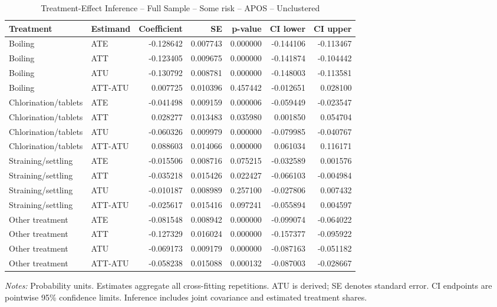 \begin{table}[htbp]
\centering
\caption{Treatment-Effect Inference -- Full Sample -- Some risk -- APOS -- Unclustered}
\label{tab:inference-SomeRiskHome-APOS-iid}
\scriptsize
\begin{adjustbox}{max width=\linewidth}
\begin{tabular}{llrrrrr}
\toprule
Treatment & Estimand & Coefficient & SE & p-value & CI lower & CI upper \\
\midrule
Boiling & ATE & -0.128642 & 0.007743 & 0.000000 & -0.144106 & -0.113467 \\
Boiling & ATT & -0.123405 & 0.009675 & 0.000000 & -0.141874 & -0.104442 \\
Boiling & ATU & -0.130792 & 0.008781 & 0.000000 & -0.148003 & -0.113581 \\
Boiling & ATT-ATU & 0.007725 & 0.010396 & 0.457442 & -0.012651 & 0.028100 \\
Chlorination/tablets & ATE & -0.041498 & 0.009159 & 0.000006 & -0.059449 & -0.023547 \\
Chlorination/tablets & ATT & 0.028277 & 0.013483 & 0.035980 & 0.001850 & 0.054704 \\
Chlorination/tablets & ATU & -0.060326 & 0.009979 & 0.000000 & -0.079985 & -0.040767 \\
Chlorination/tablets & ATT-ATU & 0.088603 & 0.014066 & 0.000000 & 0.061034 & 0.116171 \\
Straining/settling & ATE & -0.015506 & 0.008716 & 0.075215 & -0.032589 & 0.001576 \\
Straining/settling & ATT & -0.035218 & 0.015426 & 0.022427 & -0.066103 & -0.004984 \\
Straining/settling & ATU & -0.010187 & 0.008989 & 0.257100 & -0.027806 & 0.007432 \\
Straining/settling & ATT-ATU & -0.025617 & 0.015416 & 0.097241 & -0.055894 & 0.004597 \\
Other treatment & ATE & -0.081548 & 0.008942 & 0.000000 & -0.099074 & -0.064022 \\
Other treatment & ATT & -0.127329 & 0.016024 & 0.000000 & -0.157377 & -0.095922 \\
Other treatment & ATU & -0.069173 & 0.009179 & 0.000000 & -0.087163 & -0.051182 \\
Other treatment & ATT-ATU & -0.058238 & 0.015088 & 0.000132 & -0.087003 & -0.028667 \\
\bottomrule
\end{tabular}

\end{adjustbox}
\par\smallskip
\begin{minipage}{\linewidth}\scriptsize \textit{Notes:} Probability units. Estimates aggregate all cross-fitting repetitions. ATU is derived; SE denotes standard error. CI endpoints are pointwise 95\% confidence limits. Inference includes joint covariance and estimated treatment shares. \end{minipage}
\end{table}

